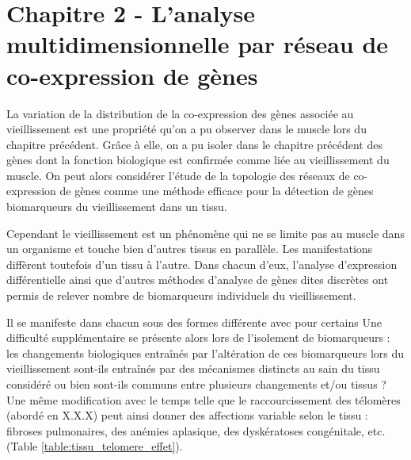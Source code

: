 \chapter{Chapitre 2 - L'analyse multidimensionnelle par réseau de co-expression de gènes}
\label{chapter:multidim}


La variation de la distribution de la co-expression des gènes associée au vieillissement est une propriété qu'on a pu observer dans le muscle lors du chapitre précédent. Grâce à elle, on a pu isoler dans le chapitre précédent des gènes dont la fonction biologique est confirmée comme liée au vieillissement du muscle. On peut alors considérer l'étude de la topologie des réseaux de co-expression de gènes comme une méthode efficace pour la détection de gènes biomarqueurs du vieillissement dans un tissu. 

Cependant le vieillissement est un phénomène qui ne se limite pas au muscle dans un organisme et touche bien d'autres tissus en parallèle. Les manifestations diffèrent toutefois d'un tissu à l'autre.
Dans chacun d'eux, l'analyse d'expression différentielle ainsi que d'autres méthodes d'analyse de gènes dites discrètes \cite{Barabasi2004} ont permis de relever nombre de biomarqueurs individuels du vieillissement. 


Il se manifeste dans chacun sous des formes  différente avec pour certains
Une difficulté supplémentaire se présente alors lors de l'isolement de biomarqueurs : les changements biologiques entraînés par l'altération de ces biomarqueurs lors du vieillissement sont-ils 
entraînés par des mécanismes distincts au sain du tissu considéré ou bien sont-ils communs entre plusieurs changements et/ou tissus ?
Une même modification avec le temps telle que le raccourcissement des télomères (abordé en X.X.X) peut ainsi donner des affections variable selon le tissu : fibroses pulmonaires, des anémies aplasique, des dyskératoses congénitale, etc. \cite{Armanios2012} (Table \ref{table:tissu_telomere_effet}). 

